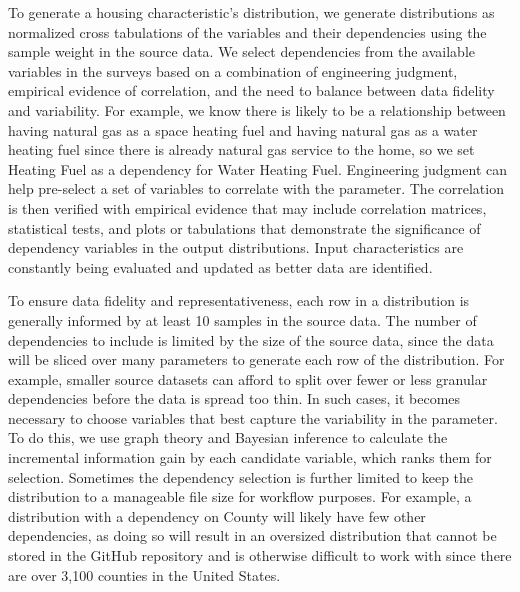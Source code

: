 To generate a housing characteristic's distribution, we generate distributions as normalized cross tabulations of the variables and their dependencies using the sample weight in the source data. We select dependencies from the available variables in the surveys based on a combination of engineering judgment, empirical evidence of correlation, and the need to balance between data fidelity and variability. For example, we know there is likely to be a relationship between having natural gas as a space heating fuel and having natural gas as a water heating fuel since there is already natural gas service to the home, so we set Heating Fuel as a dependency for Water Heating Fuel. Engineering judgment can help pre-select a set of variables to correlate with the parameter. The correlation is then verified with empirical evidence that may include correlation matrices, statistical tests, and plots or tabulations that demonstrate the significance of dependency variables in the output distributions. Input characteristics are constantly being evaluated and updated as better data are identified.

To ensure data fidelity and representativeness, each row in a distribution is generally informed by at least 10 samples in the source data. The number of dependencies to include is limited by the size of the source data, since the data will be sliced over many parameters to generate each row of the distribution. For example, smaller source datasets can afford to split over fewer or less granular dependencies before the data is spread too thin. In such cases, it becomes necessary to choose variables that best capture the variability in the parameter. To do this, we use graph theory and Bayesian inference to calculate the incremental information gain by each candidate variable, which ranks them for selection. Sometimes the dependency selection is further limited to keep the distribution to a manageable file size for workflow purposes. For example, a distribution with a dependency on County will likely have few other dependencies, as doing so will result in an oversized distribution that cannot be stored in the GitHub repository and is otherwise difficult to work with since there are over 3,100 counties in the United States.

